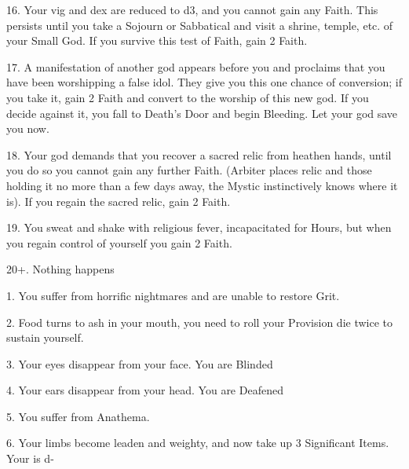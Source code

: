 16. Your {vig} and {dex} are reduced to d3, and you cannot gain any Faith.  This persists until you take a Sojourn or Sabbatical and visit a shrine, temple, etc. of your Small God.  If you survive this test of Faith, gain 2 Faith.








17. A manifestation of another god appears before you and proclaims that you have been worshipping a false idol. They give you this one chance of conversion; if you take it, gain 2 Faith and convert to the worship of this new god.  If you decide against it, you fall to Death's Door and begin Bleeding.  Let your god save you now.




18. Your god demands that you recover a sacred relic from heathen hands, until you do so you cannot gain any further Faith. (Arbiter places relic and those holding it no more than a few days away, the Mystic instinctively knows where it is).  If you regain the sacred relic, gain 2 Faith.



19. You sweat and shake with religious fever, incapacitated for Hours, but when you regain control of yourself you gain 2 Faith.



20+.  Nothing happens











1. You suffer from horrific nightmares and are unable to restore Grit.



2. Food turns to ash in your mouth, you need to roll your Provision die twice to sustain yourself.



3. Your eyes disappear from your face. You are Blinded




4. Your ears disappear from your head.  You are Deafened



5. You suffer from Anathema.



6. Your limbs become leaden and weighty, and now take up 3 Significant Items.  Your \MD is {d-}



